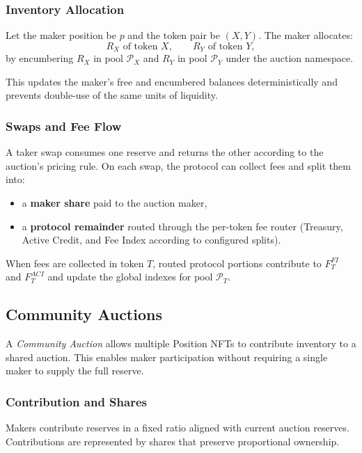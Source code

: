 \documentclass[version=preprint]{iacrcc}
\begin{document}
\subsubsection{Inventory Allocation}

Let the maker position be $p$ and the token pair be $(X, Y)$. The maker allocates:
\[
R_X \text{ of token } X, \qquad R_Y \text{ of token } Y,
\]
by encumbering $R_X$ in pool $\mathcal{P}_X$ and $R_Y$ in pool $\mathcal{P}_Y$ under the auction namespace.

This updates the maker's free and encumbered balances deterministically and prevents double-use of the same units of liquidity.

\subsubsection{Swaps and Fee Flow}

A taker swap consumes one reserve and returns the other according to the auction’s pricing rule. On each swap, the protocol can collect fees and split them into:
\begin{itemize}
  \item a \textbf{maker share} paid to the auction maker,
  \item a \textbf{protocol remainder} routed through the per-token fee router (Treasury, Active Credit, and Fee Index according to configured splits).
\end{itemize}

When fees are collected in token $T$, routed protocol portions contribute to $F^{FI}_T$ and $F^{ACI}_T$ and update the global indexes for pool $\mathcal{P}_T$.

\subsection{Community Auctions}

A \textit{Community Auction} allows multiple Position NFTs to contribute inventory to a shared auction. This enables maker participation without requiring a single maker to supply the full reserve.

\subsubsection{Contribution and Shares}

Makers contribute reserves in a fixed ratio aligned with current auction reserves. Contributions are represented by shares that preserve proportional ownership.
\end{document}
